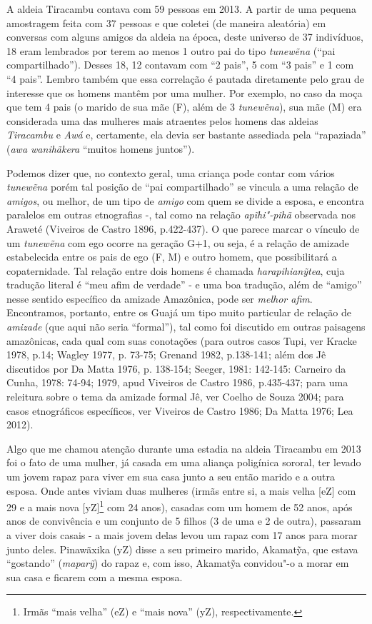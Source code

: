A aldeia Tiracambu contava com 59 pessoas em 2013. A partir de uma
pequena amostragem feita com 37 pessoas e que coletei (de maneira
aleatória) em conversas com alguns amigos da aldeia na época, deste
universo de 37 indivíduos, 18 eram lembrados por terem ao menos 1 outro
pai do tipo \emph{tunewẽna} (``pai compartilhado''). Desses 18, 12
contavam com ``2 pais'', 5 com ``3 pais'' e 1 com ``4 pais''. Lembro
também que essa correlação é pautada diretamente pelo grau de interesse
que os homens mantêm por uma mulher. Por exemplo, no caso da moça que
tem 4 pais (o marido de sua mãe (F), além de 3 \emph{tunewẽna}), sua mãe
(M) era considerada uma das mulheres mais atraentes pelos homens das
aldeias \emph{Tiracambu} e \emph{Awá} e, certamente, ela devia ser
bastante assediada pela ``rapaziada'' (\emph{awa wanihãkera} ``muitos
homens juntos'').

Podemos dizer que, no contexto geral, uma criança pode contar com vários
\emph{tunewẽna} porém tal posição de ``pai compartilhado'' se vincula a
uma relação de \emph{amigos}, ou melhor, de um tipo de \emph{amigo} com
quem se divide a esposa, e encontra paralelos em outras etnografias -,
tal como na relação \emph{apĩhi"-pihã} observada nos Araweté (Viveiros de
Castro 1896, p.422-437). O que parece marcar o vínculo de um
\emph{tunewẽna} com ego ocorre na geração G+1, ou seja, é a relação de
amizade estabelecida entre os pais de ego (F, M) e outro homem, que
possibilitará a copaternidade. Tal relação entre dois homens é chamada
\emph{harapihianỹtea}, cuja tradução literal é ``meu afim de verdade'' -
e uma boa tradução, além de ``amigo'' nesse sentido específico da
amizade Amazônica, pode ser \emph{melhor afim}. Encontramos, portanto,
entre os Guajá um tipo muito particular de relação de \emph{amizade}
(que aqui não seria ``formal''), tal como foi discutido em outras
paisagens amazônicas, cada qual com suas conotações (para outros casos
Tupi, ver Kracke 1978, p.14; Wagley 1977, p. 73-75; Grenand 1982,
p.138-141; além dos Jê discutidos por Da Matta 1976, p. 138-154; Seeger,
1981: 142-145: Carneiro da Cunha, 1978: 74-94; 1979, apud Viveiros de
Castro 1986, p.435-437; para uma releitura sobre o tema da amizade
formal Jê, ver Coelho de Souza 2004; para casos etnográficos
específicos, ver Viveiros de Castro 1986; Da Matta 1976; Lea 2012).

Algo que me chamou atenção durante uma estadia na aldeia Tiracambu em
2013 foi o fato de uma mulher, já casada em uma aliança poligínica
sororal, ter levado um jovem rapaz para viver em sua casa junto a seu
então marido e a outra esposa. Onde antes viviam duas mulheres (irmãs
entre si, a mais velha {[}eZ{]} com 29 e a mais nova {[}yZ{]}\footnote{Irmãs
  ``mais velha'' (eZ) e ``mais nova'' (yZ), respectivamente.} com 24
anos), casadas com um homem de 52 anos, após anos de convivência e um
conjunto de 5 filhos (3 de uma e 2 de outra), passaram a viver dois
casais - a mais jovem delas levou um rapaz com 17 anos para morar junto
deles. Pinawãxika (yZ) disse a seu primeiro marido, Akamatỹa, que estava
``gostando'' (\emph{maparỹ}) do rapaz e, com isso, Akamatỹa convidou"-o a
morar em sua casa e ficarem com a mesma esposa.


